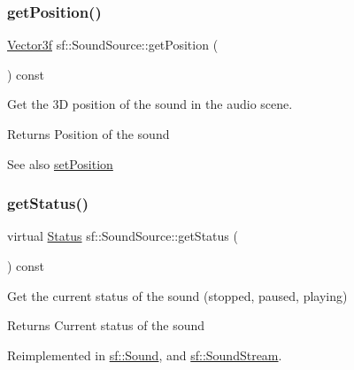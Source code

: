 \subsubsection{\texorpdfstring{getPosition()}{getPosition()}}
{\footnotesize\ttfamily \mbox{\hyperlink{classsf_1_1_vector3}{Vector3f}} sf\+::\+Sound\+Source\+::get\+Position (\begin{DoxyParamCaption}{ }\end{DoxyParamCaption}) const}



Get the 3D position of the sound in the audio scene. 

\begin{DoxyReturn}{Returns}
Position of the sound
\end{DoxyReturn}
\begin{DoxySeeAlso}{See also}
\mbox{\hyperlink{classsf_1_1_sound_source_a0480257ea25d986eba6cc3c1a6f8d7c2}{set\+Position}} \begin{DoxyVerb}\end{DoxyVerb}
 
\end{DoxySeeAlso}
\mbox{\label{classsf_1_1_sound_source_aa8d313c31b968159582a999aa66e5ed7}} 
\subsubsection{\texorpdfstring{getStatus()}{getStatus()}}
{\footnotesize\ttfamily virtual \mbox{\hyperlink{classsf_1_1_sound_source_ac43af72c98c077500b239bc75b812f03}{Status}} sf\+::\+Sound\+Source\+::get\+Status (\begin{DoxyParamCaption}{ }\end{DoxyParamCaption}) const\hspace{0.3cm}{\ttfamily [virtual]}}



Get the current status of the sound (stopped, paused, playing) 

\begin{DoxyReturn}{Returns}
Current status of the sound \begin{DoxyVerb}\end{DoxyVerb}
 
\end{DoxyReturn}


Reimplemented in \mbox{\hyperlink{classsf_1_1_sound_a406fc363594a7718a53ebef49a870f51}{sf\+::\+Sound}}, and \mbox{\hyperlink{classsf_1_1_sound_stream_a64a8193ed728da37c115c65de015849f}{sf\+::\+Sound\+Stream}}.

